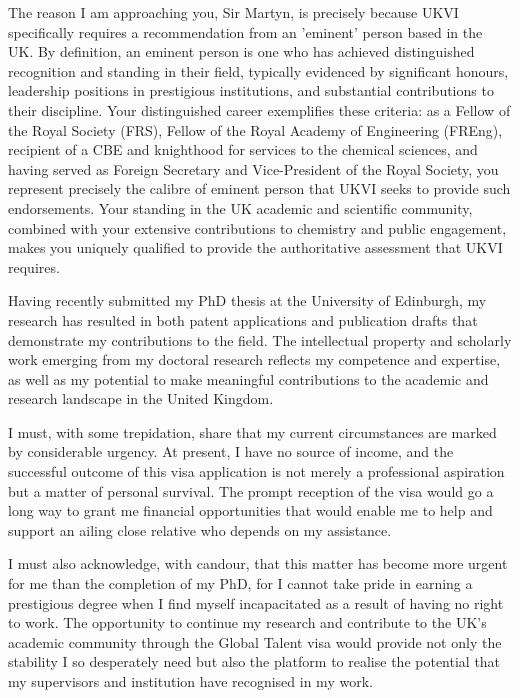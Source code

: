 \documentclass[12pt,a4paper]{letter}
\begin{document}
\begin{letter}
The reason I am approaching you, Sir Martyn, is precisely because UKVI specifically requires a recommendation from an 'eminent' person based in the UK. By definition, an eminent person is one who has achieved distinguished recognition and standing in their field, typically evidenced by significant honours, leadership positions in prestigious institutions, and substantial contributions to their discipline. Your distinguished career exemplifies these criteria: as a Fellow of the Royal Society (FRS), Fellow of the Royal Academy of Engineering (FREng), recipient of a CBE and knighthood for services to the chemical sciences, and having served as Foreign Secretary and Vice-President of the Royal Society, you represent precisely the calibre of eminent person that UKVI seeks to provide such endorsements. Your standing in the UK academic and scientific community, combined with your extensive contributions to chemistry and public engagement, makes you uniquely qualified to provide the authoritative assessment that UKVI requires.

Having recently submitted my PhD thesis at the University of Edinburgh, my research has resulted in both patent applications and publication drafts that demonstrate my contributions to the field. The intellectual property and scholarly work emerging from my doctoral research reflects my competence and expertise, as well as my potential to make meaningful contributions to the academic and research landscape in the United Kingdom.


I must, with some trepidation, share that my current circumstances are marked by considerable urgency. At present, I have no source of income, and the successful outcome of this visa application is not merely a professional aspiration but a matter of personal survival. The prompt reception of the visa would go a long way to grant me financial opportunities that would enable me to help and support an ailing close relative who depends on my assistance. 

I must also acknowledge, with candour, that this matter has become more urgent for me than the completion of my PhD, for I cannot take pride in earning a prestigious degree when I find myself incapacitated as a result of having no right to work. The opportunity to continue my research and contribute to the UK's academic community through the Global Talent visa would provide not only the stability I so desperately need but also the platform to realise the potential that my supervisors and institution have recognised in my work.


\end{letter}
\end{document}
